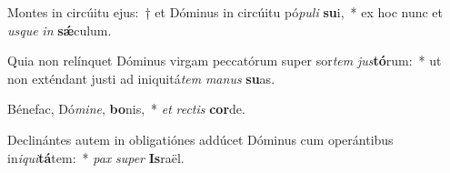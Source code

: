 \item Montes in circúitu ejus:~† et Dóminus in circúitu pó\textit{pu}\textit{li} \textbf{su}i,~* ex hoc nunc et \textit{us}\textit{que} \textit{in} \textbf{sǽ}culum.
\item Quia non relínquet Dóminus virgam peccatórum super sor\textit{tem} \textit{jus}\textbf{tó}rum:~* ut non exténdant justi ad iniquitá\textit{tem} \textit{ma}\textit{nus} \textbf{su}as.
\item Bénefac, Dó\textit{mi}\textit{ne}, \textbf{bo}nis,~* \textit{et} \textit{rec}\textit{tis} \textbf{cor}de.
\item Declinántes autem in obligatiónes addúcet Dóminus cum operántibus in\textit{i}\textit{qui}\textbf{tá}tem:~* \textit{pax} \textit{su}\textit{per} \textbf{Is}raël.
